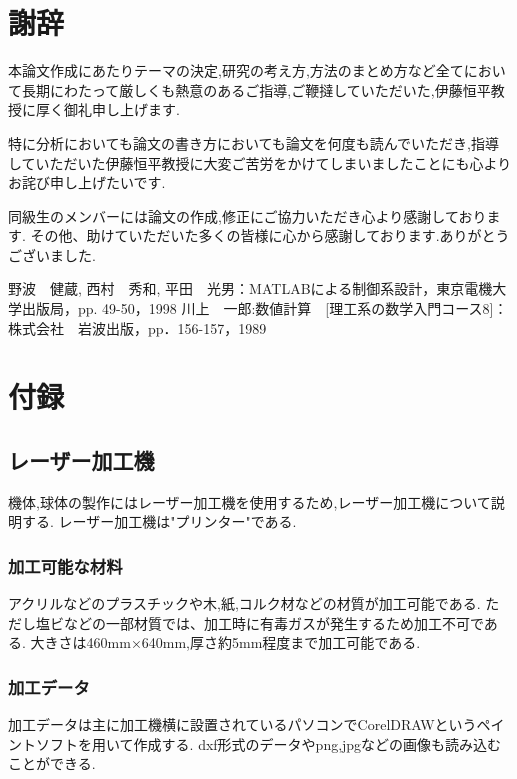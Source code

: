 \documentclass[12pt,oneside]{sotsuken_paper}
\begin{document}
\chapter*{謝辞}
本論文作成にあたりテーマの決定,研究の考え方,方法のまとめ方など全てにおいて長期にわたって厳しくも熱意のあるご指導,ご鞭撻していただいた,伊藤恒平教授に厚く御礼申し上げます.


特に分析においても論文の書き方においても論文を何度も読んでいただき,指導していただいた伊藤恒平教授に大変ご苦労をかけてしまいましたことにも心よりお詫び申し上げたいです.


同級生のメンバーには論文の作成,修正にご協力いただき心より感謝しております.
その他、助けていただいた多くの皆様に心から感謝しております.ありがとうございました.

\begin{thebibliography}{8}
	 野波　健蔵, 西村　秀和, 平田　光男：MATLABによる制御系設計，東京電機大学出版局，pp. 49-50，1998
	 川上　一郎:数値計算　[理工系の数学入門コース8]：株式会社　岩波出版，pp．156-157，1989
\end{thebibliography}

\chapter*{付録}

\section{レーザー加工機}
機体,球体の製作にはレーザー加工機を使用するため,レーザー加工機について説明する.
レーザー加工機は"プリンター"である.

\subsection{加工可能な材料}
アクリルなどのプラスチックや木,紙,コルク材などの材質が加工可能である.
ただし塩ビなどの一部材質では、加工時に有毒ガスが発生するため加工不可である.
大きさは460mm×640mm,厚さ約5mm程度まで加工可能である.

\subsection{加工データ}
加工データは主に加工機横に設置されているパソコンでCorelDRAWというペイントソフトを用いて作成する.
dxf形式のデータやpng,jpgなどの画像も読み込むことができる.
\end{document}
